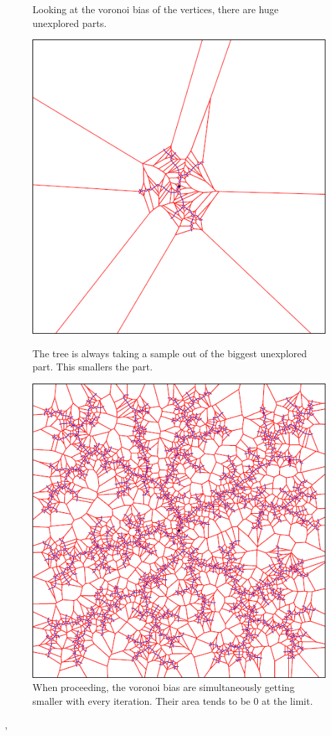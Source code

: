 \documentclass[conference]{IEEEtran}
\begin{document}
\begin{figure}[h]
\begin{minipage}[t]{0.3\linewidth}
\caption{Looking at the voronoi bias of the vertices, there are huge unexplored parts.}
\end{minipage}
\hfill
\begin{minipage}[t]{0.3\linewidth}
\centering
\includegraphics[width=1\textwidth]{images/RRT/02_v.png}
\caption{The tree is always taking a sample out of the biggest unexplored part. This smallers the part.}
\end{minipage}
\hfill
\begin{minipage}[t]{0.3\linewidth}
\centering
\includegraphics[width=1\textwidth]{images/RRT/03_v.png}
\caption{When proceeding, the voronoi bias are simultaneously getting smaller with every iteration. Their area tends to be 0 at the limit.}
\end{minipage}
\end{figure}
\cite{LaValle.October1998}, \cite{OktayArslan.December2015}
\end{document}
